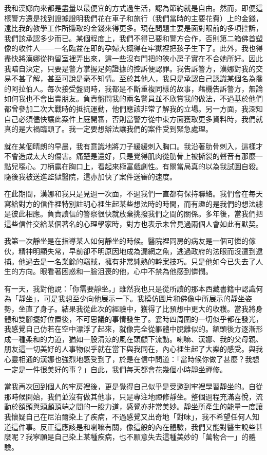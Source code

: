 我和漢娜向來都是盡量以最便宜的方式過生活，認為節約就是自由。然而，即便這樣警方還是找到證據證明我們花在車子和旅行（我們當時的主要花費）上的金錢，遠比我的教學工作所賺取的金錢來得更多。現在問題主要是面對眼前的多項控訴，我們該承認多少而已。某個程度上，我們不得已要和警方合作，否則第二箱佛首塑像的收件人——一名臨盆在即的孕婦大概得在牢獄裡把孩子生下了。此外，我也得盡快將漢娜從拘留室裡弄出來，這一些沒有門把的狹小房子實在不合她所好。因此我暗自決定，只要是警方掌握足夠證據的控訴便認罪。我告訴警方，漢娜對我的交易不甚了解，甚至可說是毫不知情。至於其他人，我只是承認自己認識某個名為喬的阿拉伯人。每次接受盤問時，我都是不斷重複同樣的故事，藉機告訴警方，無論如何我也不會出賣朋友。負責盤問我的兩名警員並不欣賞我的做法，不過基於他們都曾參加二次大戰時的抵抗運動，他們應該非常了解我的立場。另一方面，我深知自己必須儘快讓此案件上庭開審，否則當警方從中東方面獲取更多資料時，我們就真的是大禍臨頭了。我一定要想辦法讓我們的案件受到緊急處理。

就在某個晴朗的早晨，我有意識地將刀子緩緩刺入胸口。我沿著肋骨刺入，這樣才不會造成太大的傷害。痛楚是還好，只是覺得肌肉從肋骨上被撕裂的聲音有那麼一點兒噁心。刀柄露在胸口上，看起來極富戲劇性。有關當局真的以為我試圖自殺。隨後我被送進監獄醫院，這亦加快了案件送審的速度。

在此期間，漢娜和我只是見過一次面，不過我們一直都有保持聯絡。我們會在每天寫給對方的信件裡特別註明心裡生起某些想法時的時間，而有趣的是我們的想法總是彼此相應。負責讀信的警察很快就放棄挑撥我們之間的關係。多年後，當我們把這些信件交給某個著名的心理學家時，對方也表示未曾見過兩個人會如此有默契。

我第一次靜坐是在指導某人如何靜坐的時候。醫院裡同房的病友是一個可憐的傢伙，精神明顯失常，早前卻不明原因地成為漏網之魚，逃過政府的法眼而沒遭到逮捕。他過去是一名業餘的竊賊，擁有非常純熟的幹案技巧。只是他如今已失去了人生的方向。眼看著困惑和一臉沮喪的他，心中不禁為他感到憐憫。

有一天，我對他說：「你需要靜坐。」雖然我也只是從所讀的那本西藏書籍中認識何為「靜坐」，可是我想至少向他展示一下。我模仿圖片和佛像中所展示的靜坐姿勢，坐直了身子。結果我從此次的經驗中，獲得了比預想中更大的收穫。當我將身體和雙腳擺好位置後，不可思議的事情發生了。霎時四周圍的一切似乎都在發光，我感覺自己仿若在空中漂浮了起來，就像完全從軀體中脫離似的。額頭後方逐漸形成一種柔和的力道，猶如一股清涼的風在頭顱下流動。喇嘛、漢娜、我的父母親、朋友這一切美好的人事物似乎就在當下與我同在，內心裡生起了大樂的感受。與我心靈相通的漢娜也強烈地感受到了，於是在信中問道：「當時候你做了甚麼？我想一定是一件很美好的事？」自此，我們每天都會花幾個小時靜坐禪修。

當我再次回到個人的牢房裡後，更是覺得自己似乎是受邀到牢裡學習靜坐的。自從那時候開始，我們並沒有做其他事，只是專注地禪修靜坐。整個過程充滿喜悅，流動於額頭與頭顱頂端之間的一股力道，感覺亦非常美妙。靜坐所產生的能量一度讓我懷疑自己在尼泊爾染上了疾病，不過感覺又出奇地「對味」，我不希望任何人知道這件事。反正這應該是和喇嘛有關，像這般的內在體驗，我們又能對醫生說些甚麼呢？我寧願是自己染上某種疾病，也不願意失去這種美妙的「萬物合一」的體驗。

